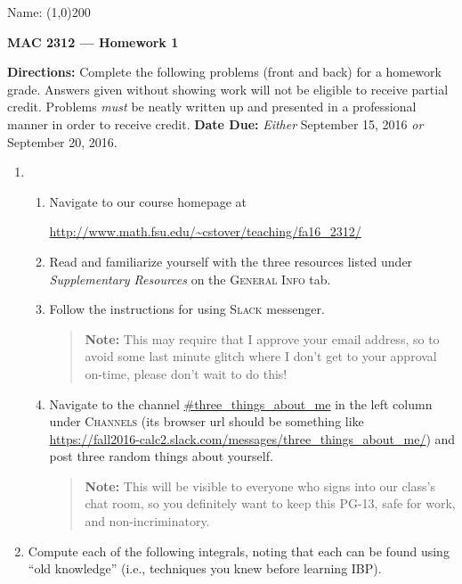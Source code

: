 \documentclass[12 pt]{article}
\begin{document}
\begin{flushright}Name: \line(1,0){200}\end{flushright}
\begin{center}
\Large{\textbf{MAC 2312 --- Homework 1}}
\end{center}
\textbf{Directions:} Complete the following problems (front and back) for a homework grade. Answers given without showing work will not be eligible to receive partial credit. Problems \textit{must} be neatly written up and presented in a professional manner in order to receive credit. \textbf{Date Due:} \textit{Either} September 15, 2016 \textit{or} September 20, 2016.
\vspace{0.125in}
\begin{enumerate}[leftmargin=0in, rightmargin=-0.25in]
	\item \begin{enumerate}
		\item Navigate to our course homepage at
		\begin{center} \url{http://www.math.fsu.edu/~cstover/teaching/fa16_2312/}
		\end{center}
		\item Read and familiarize yourself with the three resources listed under \textit{Supplementary Resources} on the \textsc{General Info} tab.
		\item Follow the instructions for using \textsc{Slack} messenger.\begin{quote}\textbf{Note:} This may require that I approve your email address, so to avoid some last minute glitch where I don't get to your approval on-time, please don't wait to do this!\end{quote}
		\item Navigate to the channel \url{#three_things_about_me} in the left column under \textsc{Channels} (its browser url should be something like \url{https://fall2016-calc2.slack.com/messages/three_things_about_me/}) and post three random things about yourself.\begin{quote}\textbf{Note:} This will be visible to everyone who signs into our class's chat room, so you definitely want to keep this PG-13, safe for work, and non-incriminatory. {\Large\smiley}\end{quote}
	\end{enumerate}
	\item Compute each of the following integrals, noting that each can be found using ``old knowledge'' (i.e., techniques you knew before learning IBP).\begin{enumerate}

\end{enumerate}
\end{enumerate}
\end{document}
